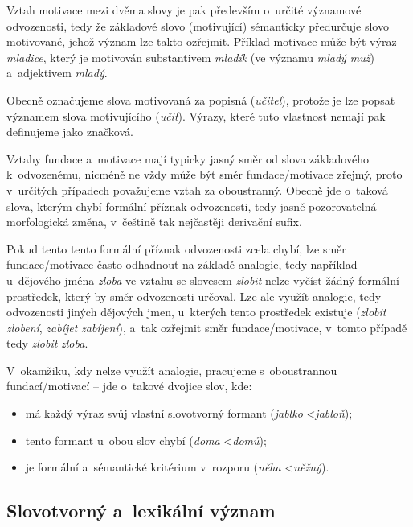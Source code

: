 Vztah motivace mezi dvěma slovy je pak především o~určité významové
odvozenosti, tedy že základové slovo (motivující) sémanticky předurčuje
slovo motivované, jehož význam lze takto ozřejmit.
\parencite[96]{dokulil00} Příklad motivace může být výraz
\emph{mladice}, který je motivován substantivem \emph{mladík} (ve
významu \emph{mladý muž}) a~adjektivem \emph{mladý}.
\parencite[110]{dokulil62}

Obecně označujeme slova motivovaná za popisná (\emph{učitel}), protože
je lze popsat významem slova motivujícího (\emph{učit}). Výrazy, které
tuto vlastnost nemají pak definujeme jako značková.
\parencite[96]{dokulil00}

Vztahy fundace a~motivace mají typicky jasný směr od slova základového
k~odvozenému, nicméně ne vždy může být směr fundace/motivace zřejmý, proto
v~určitých případech považujeme vztah za oboustranný. Obecně jde
o~taková slova, kterým chybí formální příznak odvozenosti, tedy jasně
pozorovatelná morfologická změna, v~češtině tak nejčastěji derivační
sufix.~\parencite[96]{dokulil00}

Pokud tento tento formální příznak odvozenosti zcela chybí, lze směr
fundace/motivace často odhadnout na základě analogie, tedy například
u~dějového jména \emph{zloba} ve vztahu se slovesem \emph{zlobit} nelze
vyčíst žádný formální prostředek, který by směr odvozenosti určoval. Lze
ale využít analogie, tedy odvozenosti jiných dějových jmen, u~kterých
tento prostředek existuje (\emph{zlobit} \rigtharrow
\emph{zlobení}, \emph{zabíjet} \rigtharrow \emph{zabíjení}), a~tak
ozřejmit směr fundace/motivace, v~tomto případě tedy \emph{zlobit}
\rigtharrow \emph{zloba}.~\parencite[96]{dokulil00}

V~okamžiku, kdy nelze využít analogie, pracujeme s~oboustrannou
fundací/motivací -- jde o~takové dvojice slov, kde:

\begin{itemize}
\tightlist
\item
  má každý výraz svůj vlastní slovotvorný formant (\emph{jablko}
  \textless{}\rigtharrow \emph{jabloň});
\item
  tento formant u~obou slov chybí (\emph{doma}
  \textless{}\rigtharrow \emph{domů});
\item
  je formální a~sémantické kritérium v~rozporu (\emph{něha}
  \textless{}\rigtharrow \emph{něžný}).~\parencite[96]{dokulil00}
\end{itemize}

\hypertarget{slovotvornuxfd-a-lexikuxe1lnuxed-vuxfdznam}{%
\subsection{Slovotvorný a~lexikální
význam}\label{slovotvornuxfd-a-lexikuxe1lnuxed-vuxfdznam}}

